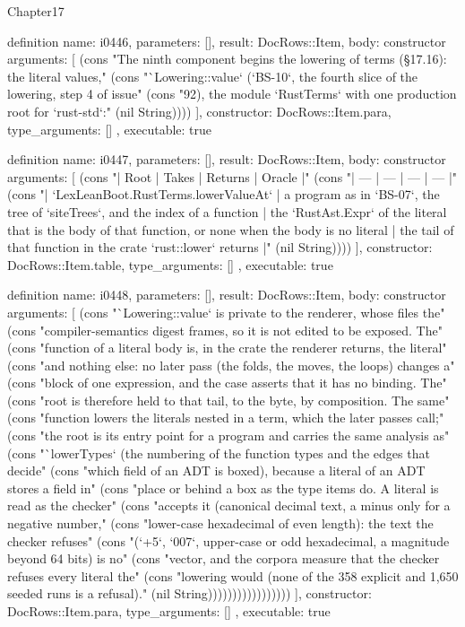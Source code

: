 \begin{lexlean}{Chapter17}
\begin{semanticmodule}
definition{
  name: i0446,
  parameters: [],
  result: DocRows::Item,
  body: constructor{
    arguments: [
      (cons "The ninth component begins the lowering of terms (§17.16): the literal values," (cons "`Lowering::value` (`BS-10`, the fourth slice of the lowering, step 4 of issue" (cons "92), the module `RustTerms` with one production root for `rust-std`:" (nil String))))
    ],
    constructor: DocRows::Item.para,
    type_arguments: []
  },
  executable: true
}

definition{
  name: i0447,
  parameters: [],
  result: DocRows::Item,
  body: constructor{
    arguments: [
      (cons "| Root | Takes | Returns | Oracle |" (cons "| --- | --- | --- | --- |" (cons "| `LexLeanBoot.RustTerms.lowerValueAt` | a program as in `BS-07`, the tree of `siteTrees`, and the index of a function | the `RustAst.Expr` of the literal that is the body of that function, or none when the body is no literal | the tail of that function in the crate `rust::lower` returns |" (nil String))))
    ],
    constructor: DocRows::Item.table,
    type_arguments: []
  },
  executable: true
}

definition{
  name: i0448,
  parameters: [],
  result: DocRows::Item,
  body: constructor{
    arguments: [
      (cons "`Lowering::value` is private to the renderer, whose files the" (cons "compiler-semantics digest frames, so it is not edited to be exposed. The" (cons "function of a literal body is, in the crate the renderer returns, the literal" (cons "and nothing else: no later pass (the folds, the moves, the loops) changes a" (cons "block of one expression, and the case asserts that it has no binding. The" (cons "root is therefore held to that tail, to the byte, by composition. The same" (cons "function lowers the literals nested in a term, which the later passes call;" (cons "the root is its entry point for a program and carries the same analysis as" (cons "`lowerTypes` (the numbering of the function types and the edges that decide" (cons "which field of an ADT is boxed), because a literal of an ADT stores a field in" (cons "place or behind a box as the type items do. A literal is read as the checker" (cons "accepts it (canonical decimal text, a minus only for a negative number," (cons "lower-case hexadecimal of even length): the text the checker refuses" (cons "(`+5`, `007`, upper-case or odd hexadecimal, a magnitude beyond 64 bits) is no" (cons "vector, and the corpora measure that the checker refuses every literal the" (cons "lowering would (none of the 358 explicit and 1,650 seeded runs is a refusal)." (nil String)))))))))))))))))
    ],
    constructor: DocRows::Item.para,
    type_arguments: []
  },
  executable: true
}


\end{semanticmodule}
\end{lexlean}
